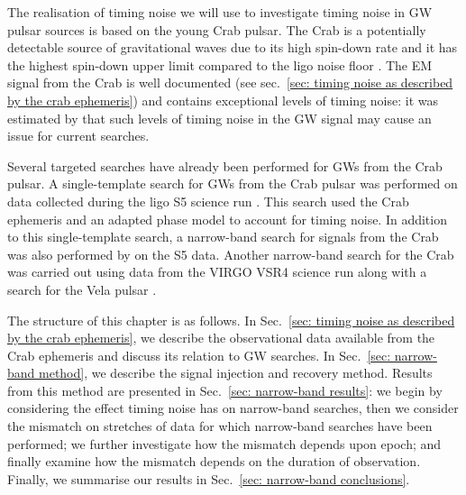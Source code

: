 \documentclass[../full_thesis/full_thesis.tex]{subfiles}
\begin{document}
The realisation of timing noise we will use to investigate timing noise in GW
pulsar sources is based on the young Crab pulsar. The Crab is a potentially
detectable  source of gravitational waves due to its high spin-down rate and it
has the highest spin-down upper limit compared to the ligo noise floor
\citep{ligo2008}. The EM signal from the Crab is well documented (see
sec.~\ref{sec: timing noise as described by the crab ephemeris}) and contains
exceptional levels of timing noise: it was estimated by \citet{Jones2004} that
such levels of timing noise in the GW signal may cause an issue for current
searches.

Several targeted searches have already
been performed for GWs from the Crab pulsar.
A single-template search for GWs from the Crab pulsar was performed on data
collected during the ligo S5 science run \citep{ligo2008}.  This search used
the Crab ephemeris and an adapted phase model to account for timing noise.  In
addition to this single-template search, a narrow-band search for signals from
the Crab was also performed by \citet{ligo2008} on the S5 data. Another
narrow-band search for the Crab was carried out using data from the VIRGO
VSR4 science run along with a search for the Vela pulsar \citep{ligo2015}.

The structure of this chapter is as follows. In Sec.~\ref{sec: timing noise
as described by the crab ephemeris}, we describe the observational data
available from the Crab ephemeris and discuss its relation to GW searches. In
Sec.~\ref{sec: narrow-band method}, we describe the signal injection and
recovery method.  Results from this method are presented in Sec.~\ref{sec:
narrow-band results}: we begin by considering the effect timing noise has on
narrow-band searches, then we consider the mismatch on stretches of data for
which narrow-band searches have been performed; we further investigate how the
mismatch depends upon epoch; and finally examine how the mismatch depends on
the duration of observation. Finally, we summarise our results in Sec.~\ref{sec:
narrow-band conclusions}.
\end{document}
